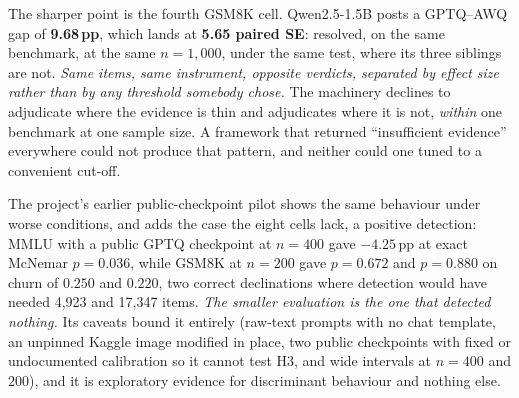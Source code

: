 The sharper point is the fourth GSM8K cell. Qwen2.5-1.5B posts a GPTQ--AWQ gap
of \textbf{9.68\,pp}, which lands at \textbf{5.65 paired SE}: resolved, on the
same benchmark, at the same $n = 1{,}000$, under the same test, where its three
siblings are not. \emph{Same items, same instrument, opposite verdicts, separated
by effect size rather than by any threshold somebody chose.} The machinery
declines to adjudicate where the evidence is thin and adjudicates where it is
not, \emph{within} one benchmark at one sample size. A framework that returned
``insufficient evidence'' everywhere could not produce that pattern, and neither
could one tuned to a convenient cut-off.

The project's earlier public-checkpoint pilot shows the same behaviour under
worse conditions, and adds the case the eight cells lack, a positive detection:
MMLU with a public GPTQ checkpoint at $n = 400$ gave $-4.25$\,pp at exact
McNemar $p = 0.036$, while GSM8K at $n = 200$ gave $p = 0.672$ and $p = 0.880$
on churn of $0.250$ and $0.220$, two correct declinations where detection would
have needed 4{,}923 and 17{,}347 items. \emph{The smaller evaluation is the one
that detected nothing.} Its caveats bound it entirely (raw-text prompts with no
chat template, an unpinned Kaggle image modified in place, two public
checkpoints with fixed or undocumented calibration so it cannot test H3, and
wide intervals at $n = 400$ and $200$), and it is exploratory evidence for
discriminant behaviour and nothing else.
